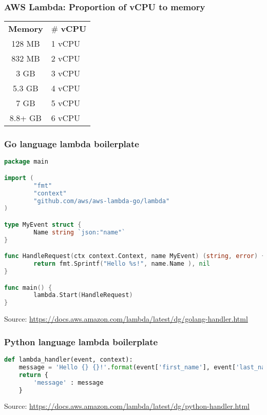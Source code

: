 \documentclass[11pt,aspectratio=169]{beamer}
\begin{document}
\begin{nrcanFrame}
  \frametitle{AWS Lambda: Proportion of vCPU to memory}
  \centering
  \begin{table}
  \begin{tabular}{cl}
      \toprule 
    \bf Memory & \# \bf vCPU \\ 
    \rowcolor{gray!50}
    128 MB & 1 vCPU \\ 
    832 MB & 2 vCPU \\ 
    \rowcolor{gray!50}
  3 GB & 3 vCPU \\ 
  5.3 GB & 4 vCPU \\
  \rowcolor{gray!50}
  7 GB & 5 vCPU \\
  8.8+ GB & 6 vCPU \\
      \bottomrule
  \end{tabular}
  \end{table}
\end{nrcanFrame}



\begin{nrcanFrame}[fragile=singleslide]
    \frametitle{Go language lambda boilerplate}
  \centering
{\scriptsize
  \begin{lstlisting}[language=go]
package main

import (
        "fmt"
        "context"
        "github.com/aws/aws-lambda-go/lambda"
)

type MyEvent struct {
        Name string `json:"name"`
}

func HandleRequest(ctx context.Context, name MyEvent) (string, error) {
        return fmt.Sprintf("Hello %s!", name.Name ), nil
}

func main() {
        lambda.Start(HandleRequest)
}
  \end{lstlisting}
}
  {\tiny Source: \url{https://docs.aws.amazon.com/lambda/latest/dg/golang-handler.html}}
\end{nrcanFrame}





  \begin{nrcanFrame}[fragile=singleslide]
    \frametitle{Python language lambda boilerplate}
               {\footnotesize
                 \begin{lstlisting}[language=python]
def lambda_handler(event, context):
    message = 'Hello {} {}!'.format(event['first_name'], event['last_name'])  
    return { 
        'message' : message
    }
                 \end{lstlisting}
                 
                 \vspace{3cm}
                        {\tiny Source: \url{https://docs.aws.amazon.com/lambda/latest/dg/python-handler.html}}}
  \end{nrcanFrame}
\end{document}
